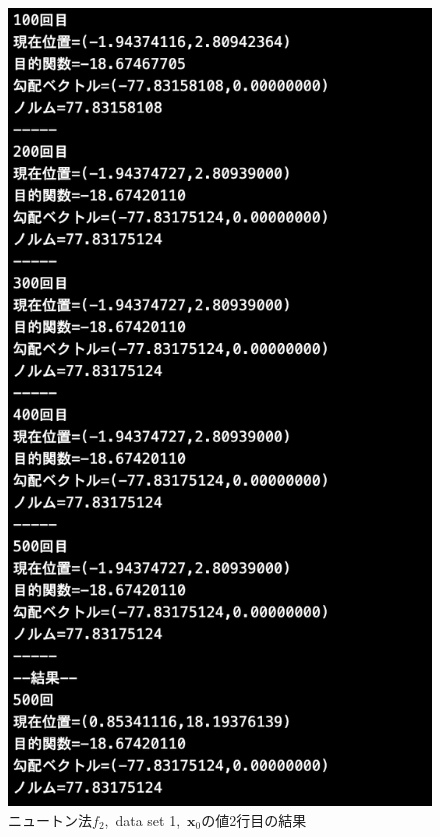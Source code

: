 \documentclass[12pt]{jarticle}
\begin{document}
\begin{figure}[h]
\begin{minipage}{0.5\hsize}
    \end{minipage}
    \begin{minipage}{0.5\hsize}
        \begin{center}
            \includegraphics[scale=0.2]{kadai1_2n_out1_2_3.png}
        \end{center}
    \end{minipage}
    \caption{ニュートン法$f_2$,\ data set 1,\ $\boldsymbol{x}_0$の値2行目の結果}
\end{figure}
\end{document}
